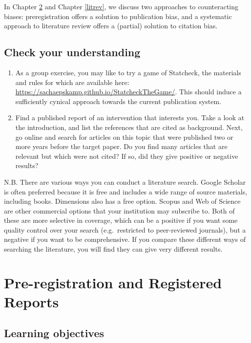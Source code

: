 \documentclass{krantz}
\begin{document}
In Chapter \ref{prereg} and Chapter \ref{litrev}, we discuss two approaches to counteracting biases: preregistration offers a solution to publication bias, and a systematic approach to literature review offers a (partial) solution to citation bias.

\hypertarget{check-your-understanding-20}{%
\section{Check your understanding}\label{check-your-understanding-20}}

\begin{enumerate}
\def\labelenumi{\arabic{enumi}.}
\item
  As a group exercise, you may like to try a game of Statcheck, the materials and rules for which are available here: \url{https://sachaepskamp.github.io/StatcheckTheGame/}. This should induce a sufficiently cynical approach towards the current publication system.
\item
  Find a published report of an intervention that interests you. Take a look at the introduction, and list the references that are cited as background. Next, go online and search for articles on this topic that were published two or more years before the target paper. Do you find many articles that are relevant but which were not cited? If so, did they give positive or negative results?
\end{enumerate}

N.B. There are various ways you can conduct a literature search. Google Scholar is often preferred because it is free and includes a wide range of source materials, including books. Dimensions also has a free option. Scopus and Web of Science are other commercial options that your institution may subscribe to. Both of these are more selective in coverage, which can be a positive if you want some quality control over your search (e.g.~restricted to peer-reviewed journals), but a negative if you want to be comprehensive. If you compare these different ways of searching the literature, you will find they can give very different results.

\hypertarget{prereg}{%
\chapter{Pre-registration and Registered Reports}\label{prereg}}

\hypertarget{learning-objectives-19}{%
\section{Learning objectives}\label{learning-objectives-19}}
\end{document}
